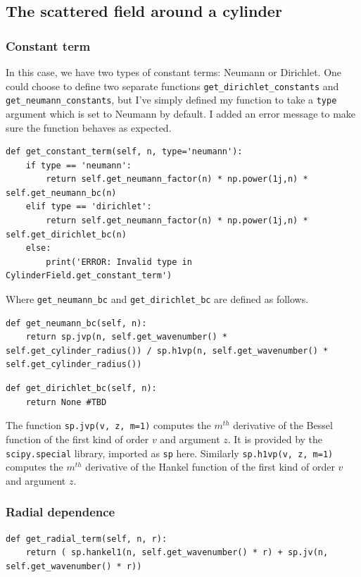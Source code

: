 \subsection{The scattered field around a cylinder}
%
\subsubsection{Constant term}
In this case, we have two types of constant terms: Neumann or Dirichlet. One could choose to define two separate functions \verb!get_dirichlet_constants! and \verb!get_neumann_constants!, but I've simply defined my function to take a \verb!type! argument which is set to Neumann by default. I added an error message to make sure the function behaves as expected.
%
  \begin{lstlisting}
def get_constant_term(self, n, type='neumann'):
    if type == 'neumann':
        return self.get_neumann_factor(n) * np.power(1j,n) * self.get_neumann_bc(n)
    elif type == 'dirichlet':
        return self.get_neumann_factor(n) * np.power(1j,n) * self.get_dirichlet_bc(n)
    else:
        print('ERROR: Invalid type in CylinderField.get_constant_term') \end{lstlisting} \par
%
Where \verb!get_neumann_bc! and \verb!get_dirichlet_bc! are defined as follows.
%
  \begin{lstlisting}
def get_neumann_bc(self, n):
    return sp.jvp(n, self.get_wavenumber() * self.get_cylinder_radius()) / sp.h1vp(n, self.get_wavenumber() * self.get_cylinder_radius()) \end{lstlisting} \par
%
  \begin{lstlisting}
def get_dirichlet_bc(self, n):
    return None #TBD \end{lstlisting}\par
%
The function \verb!sp.jvp(v, z, m=1)! computes the $m^{th}$ derivative of the Bessel function of the first kind of order $v$ and argument $z$. It is provided by the \verb!scipy.special! library, imported as \verb!sp! here. Similarly \verb!sp.h1vp(v, z, m=1)! computes the $m^{th}$ derivative of the Hankel function of the first kind of order $v$ and argument $z$.

\subsubsection{Radial dependence}
%
  \begin{lstlisting}
def get_radial_term(self, n, r):
    return ( sp.hankel1(n, self.get_wavenumber() * r) + sp.jv(n, self.get_wavenumber() * r))\end{lstlisting}
%
